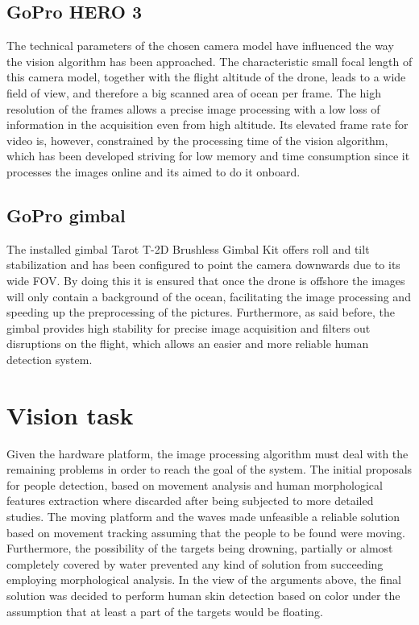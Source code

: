 \subsection{GoPro HERO 3}
The technical parameters of the chosen camera model have influenced the way the vision algorithm has been approached.
The characteristic small focal length of this camera model, together with the flight altitude of the drone, leads to a wide field of view, and therefore a big scanned area of ocean per frame. 
The high resolution of the frames allows a precise image processing with a low loss of information in the acquisition even from high altitude.
Its elevated frame rate for video is, however, constrained by the processing time of the vision algorithm, which has been developed striving for low memory and time consumption since it processes the images online and its aimed to do it onboard.

\subsection{GoPro gimbal}
The installed gimbal Tarot T-2D Brushless Gimbal Kit offers roll and tilt stabilization and has been configured to point the camera downwards due to its wide FOV. 
By doing this it is ensured that once the drone is offshore the images will only contain a background of the ocean, facilitating the image processing and speeding up the preprocessing of the pictures.
Furthermore, as said before, the gimbal provides high stability for precise image acquisition and filters out disruptions on the flight, which allows an easier and more reliable human detection system.


\section{Vision task}
Given the hardware platform, the image processing algorithm must deal with the remaining problems in order to reach the goal of the system. 
The initial proposals for people detection, based on movement analysis and human morphological features extraction where discarded after being subjected to more detailed studies. 
The moving platform and the waves made unfeasible a reliable solution based on movement tracking assuming that the people to be found were moving.
Furthermore, the possibility of the targets being drowning, partially or almost completely covered by water prevented any kind of solution from succeeding employing morphological analysis. 
In the view of the arguments above, the final solution was decided to perform human skin detection based on color under the assumption that at least a part of the targets would be floating. 



